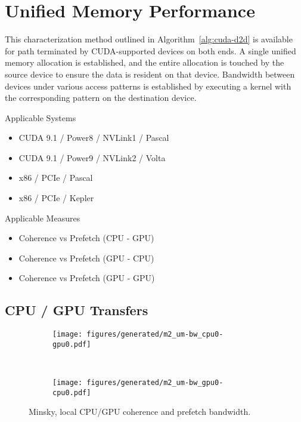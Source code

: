\chapter{Unified Memory Performance}
\label{ch:unified-char}

This characterization method outlined in Algorithm~\ref{alg:cuda-d2d} is available for path terminated by CUDA-supported devices on both ends.
A single unified memory allocation is established, and the entire allocation is touched by the source device to ensure the data is resident on that device.
Bandwidth between devices under various access patterns is established by executing a kernel with the corresponding pattern on the destination device.

Applicable Systems
\begin{itemize}
    \item CUDA 9.1 / Power8 / NVLink1 / Pascal
    \item CUDA 9.1 / Power9 / NVLink2 / Volta
    \item x86 / PCIe / Pascal
    \item x86 / PCIe / Kepler
\end{itemize}

Applicable Measures
\begin{itemize}
    \item Coherence vs Prefetch (CPU - GPU)
    \item Coherence vs Prefetch (GPU - CPU)
    \item Coherence vs Prefetch (GPU - GPU)
\end{itemize}



\section{CPU / GPU Transfers}

\begin{figure}[ht]
    \centering
    \begin{subfigure}[b]{0.45\textwidth}
        \texttt{[image: figures/generated/m2\_um-bw\_cpu0-gpu0.pdf]}
        \caption{}
        \label{fig:minsky-topo-hardware}
    \end{subfigure}
    ~
    \begin{subfigure}[b]{0.45\textwidth}
        \texttt{[image: figures/generated/m2\_um-bw\_gpu0-cpu0.pdf]}
        \caption{}
        \label{fig:minsky-topo-cuda-simple}
    \end{subfigure}
    \caption[]{Minsky, local CPU/GPU coherence and prefetch bandwidth.}
    \label{fig:minsky-hardware-logical}
\end{figure}

